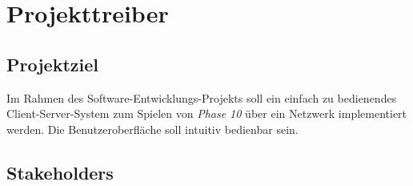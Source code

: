 \chapter{Projekttreiber}

\section{Projektziel}

Im Rahmen des Software-Entwicklungs-Projekts {\the\year} soll ein einfach zu bedienendes Client-Server-System zum Spielen von \textit{Phase 10} über ein Netzwerk implementiert werden. Die Benutzeroberfläche soll intuitiv bedienbar sein.

\section{Stakeholders}

\setcounter{sh}{10}

